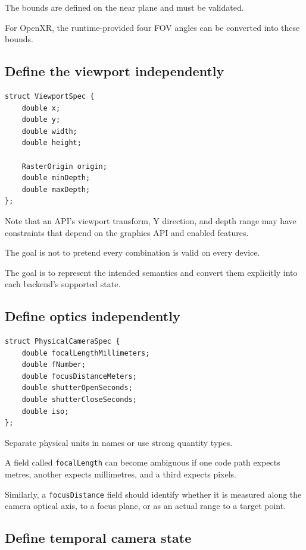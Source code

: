 The bounds are defined on the near plane and must be validated.

For OpenXR, the runtime-provided four FOV angles can be converted into these bounds.

\subsection{Define the viewport independently}\label{02-foundations-ii-ch037-define-the-viewport-independently}

\begin{verbatim}
struct ViewportSpec {
    double x;
    double y;
    double width;
    double height;

    RasterOrigin origin;
    double minDepth;
    double maxDepth;
};
\end{verbatim}

Note that an API's viewport transform, Y direction, and depth range may have constraints that depend on the graphics API and enabled features.

The goal is not to pretend every combination is valid on every device.

The goal is to represent the intended semantics and convert them explicitly into each backend's supported state.

\subsection{Define optics independently}\label{02-foundations-ii-ch037-define-optics-independently}

\begin{verbatim}
struct PhysicalCameraSpec {
    double focalLengthMillimeters;
    double fNumber;
    double focusDistanceMeters;
    double shutterOpenSeconds;
    double shutterCloseSeconds;
    double iso;
};
\end{verbatim}

Separate physical units in names or use strong quantity types.

A field called \texttt{focalLength} can become ambiguous if one code path expects metres, another expects millimetres, and a third expects pixels.

Similarly, a \texttt{focusDistance} field should identify whether it is measured along the camera optical axis, to a focus plane, or as an actual range to a target point.

\subsection{Define temporal camera state}\label{02-foundations-ii-ch037-define-temporal-camera-state}

